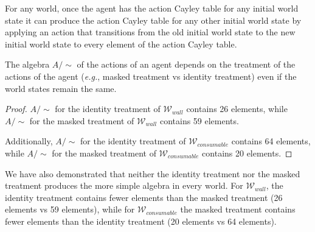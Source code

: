 \begin{remark}
    For any world, once the agent has the action Cayley table for any initial world state it can produce the action Cayley table for any other initial world state by applying an action that transitions from the old initial world state to the new initial world state to every element of the action Cayley table.
\end{remark}

\begin{proposition}\label{prp:algebra_depends_on_action_treatment}
    The algebra $A/\sim$ of the actions of an agent depends on the treatment of the actions of the agent (\textit{e.g.}, masked treatment vs identity treatment) even if the world states remain the same.
\end{proposition}
\begin{proof}
    $A/\sim$ for the identity treatment of $\mathscr{W}_{wall}$ contains 26 elements, while $A/\sim$ for the masked treatment of $\mathscr{W}_{wall}$ contains 59 elements.

    Additionally, $A/\sim$ for the identity treatment of $\mathscr{W}_{consumable}$ contains 64 elements, while $A/\sim$ for the masked treatment of $\mathscr{W}_{consumable}$ contains 20 elements.
\end{proof}

We have also demonstrated that neither the identity treatment nor the masked treatment produces the more simple algebra in every world.
For $\mathscr{W}_{wall}$, the identity treatment contains fewer elements than the masked treatment (26 elements vs 59 elements), while for $\mathscr{W}_{consumable}$ the masked treatment contains fewer elements than the identity treatment (20 elements vs 64 elements).


